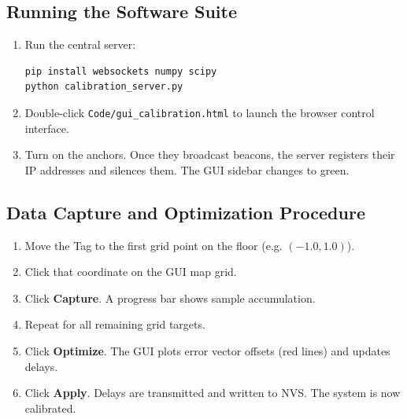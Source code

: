\documentclass[11pt,a4paper]{article}
\begin{document}
\subsection{Running the Software Suite}
\begin{enumerate}
    \item Run the central server:
    \begin{lstlisting}[language=bash]
pip install websockets numpy scipy
python calibration_server.py
    \end{lstlisting}
    \item Double-click \texttt{Code/gui\_calibration.html} to launch the browser control interface.
    \item Turn on the anchors. Once they broadcast beacons, the server registers their IP addresses and silences them. The GUI sidebar changes to green.
\end{enumerate}

\subsection{Data Capture and Optimization Procedure}
\begin{enumerate}
    \item Move the Tag to the first grid point on the floor (e.g. $(-1.0, 1.0)$).
    \item Click that coordinate on the GUI map grid.
    \item Click \textbf{Capture}. A progress bar shows sample accumulation.
    \item Repeat for all remaining grid targets.
    \item Click \textbf{Optimize}. The GUI plots error vector offsets (red lines) and updates delays.
    \item Click \textbf{Apply}. Delays are transmitted and written to NVS. The system is now calibrated.
\end{enumerate}
\end{document}
